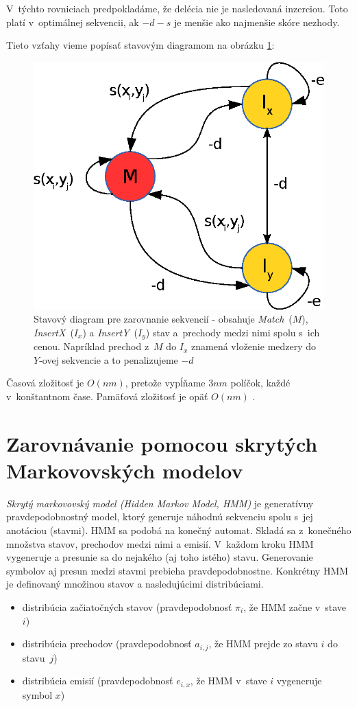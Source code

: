 V~týchto rovniciach predpokladáme, že delécia nie je nasledovaná inzerciou. Toto platí v~optimálnej sekvencii, ak $-d-s$ je menšie ako najmenšie skóre nezhody.

Tieto vzťahy vieme popísať stavovým diagramom na obrázku \ref{fig:alignment-fsa}:
\begin{figure}[h]
    \centering
    \includegraphics[width=.4\textwidth]{images/alignment_fsa}
    \caption[Stavový diagram pre zarovnanie sekvencií]{Stavový diagram pre zarovnanie sekvencií - obsahuje \textit{Match}~($M$), \textit{InsertX}~($I_x$) a \textit{InsertY}~($I_y$) stav a~prechody medzi nimi spolu s~ich cenou. Napríklad prechod z~$M$ do $I_x$ znamená vloženie medzery do $Y$-ovej sekvencie a to penalizujeme $-d$}
    \label{fig:alignment-fsa}
\end{figure}

Časová zložitosť je $O(nm)$, pretože vypĺňame $3nm$ políčok, každé v~konštantnom čase. Pamäťová zložitosť je opäť $O(nm)$
\cite{durbin}.

\section[Zarovnávanie s~pHMM]{Zarovnávanie pomocou skrytých Markovovských modelov}
\label{sec:hmm-alignment}

\textit{Skrytý markovovský model (Hidden Markov Model, HMM)} je generatívny pravdepodobnostný model, ktorý generuje náhodnú sekvenciu spolu s~jej anotáciou (stavmi). HMM sa podobá na konečný automat. Skladá sa z~konečného množstva stavov, prechodov medzi nimi a emisií.
V~každom kroku HMM vygeneruje a presunie sa do nejakého (aj toho istého) stavu. Generovanie symbolov aj presun medzi stavmi prebieha pravdepodobnostne.
Konkrétny HMM je definovaný množinou stavov a nasledujúcimi distribúciami.
\begin{itemize}
\item distribúcia začiatočných stavov (pravdepodobnosť $\pi_i$, že HMM začne v~stave $i$)
\item distribúcia prechodov (pravdepodobnosť $a_{i,j}$, že HMM prejde zo stavu $i$ do stavu~$j$)
\item distribúcia emisií (pravdepodobnosť $e_{i,x}$, že HMM v~stave $i$ vygeneruje symbol $x$)
\end{itemize}

